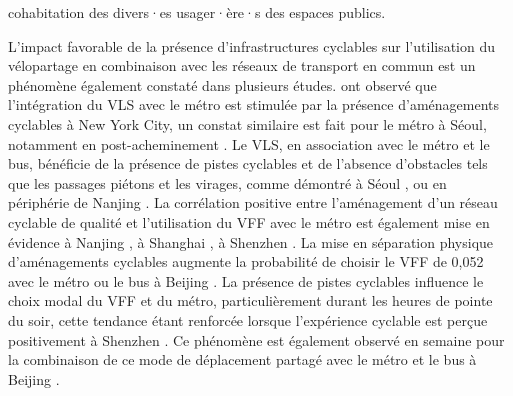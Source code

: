 \begin{refsegment}
cohabitation des divers·es usager·ère·s des espaces publics.%

L'impact favorable de la présence d'infrastructures cyclables sur l'utilisation du vélopartage en combinaison avec les réseaux de transport en commun est un phénomène également constaté dans plusieurs études. \textcolor{blue}{\textcite[932]{ashraf_impacts_2021}} ont observé que l'intégration du \acrshort{VLS} avec le métro est stimulée par la présence d'aménagements cyclables à New York City, un constat similaire est fait pour le métro à Séoul, notamment en post-acheminement \textcolor{blue}{\autocite[3111]{cho_estimation_2022}}. Le \acrshort{VLS}, en association avec le métro et le bus, bénéficie de la présence de pistes cyclables et de l'absence d'obstacles tels que les passages piétons et les virages, comme démontré à Séoul \textcolor{blue}{\autocite[9]{kim_analysis_2021}}, ou en périphérie de Nanjing \textcolor{blue}{\autocite[14]{ji_exploring_2018}}. La corrélation positive entre l'aménagement d'un réseau cyclable de qualité et l'utilisation du \acrshort{VFF} avec le métro est également mise en évidence à Nanjing \textcolor{blue}{\autocite[9]{liu_use_2020}}, à Shanghai \textcolor{blue}{\autocite[29-30]{lin_analysis_2019}}, à Shenzhen \textcolor{blue}{\autocite[3]{wu_measuring_2019}}. La mise en séparation physique d'aménagements cyclables augmente la probabilité de choisir le \acrshort{VFF} de 0,052 avec le métro ou le bus à Beijing \textcolor{blue}{\autocite[7]{liu_mode_2022}}. La présence de pistes cyclables influence le choix modal du \acrshort{VFF} et du métro, particulièrement durant les heures de pointe du soir, cette tendance étant renforcée lorsque l'expérience cyclable est perçue positivement à Shenzhen \textcolor{blue}{\autocites[12]{guo_built_2020}[388]{guo_role_2021}[24]{guo_dockless_2021}}. Ce phénomène est également observé en semaine pour la combinaison de ce mode de déplacement partagé avec le métro et le bus à Beijing \textcolor{blue}{\autocite[7]{zhou_spatially_2023}}.%


\end{refsegment}
